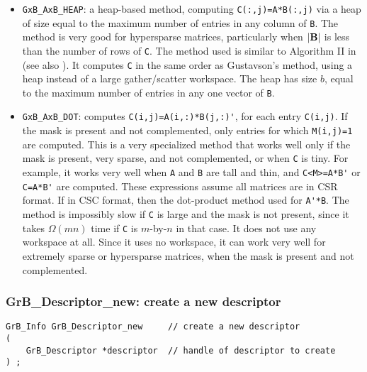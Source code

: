 \documentclass[12pt]{article}
\begin{document}
\begin{itemize}
\begin{itemize}
    \item \verb'GxB_AxB_HEAP': a heap-based method, computing
    \verb'C(:,j)=A*B(:,j)' via a heap of size equal to the maximum number of
    entries in any column of \verb'B'.  The method is very good for hypersparse
    matrices, particularly when $|{\bf B}|$ is less than the number of rows of
    \verb'C'.  The method used is similar to Algorithm II in
    \cite{BulucGilbert08} (see also \cite{BulucGilbert12}).  It computes
    \verb'C' in the same order as Gustavson's method, using a heap instead of a
    large gather/scatter workspace.  The heap has size $b$, equal to the
    maximum number of entries in any one vector of \verb'B'.

    \item \verb'GxB_AxB_DOT': computes \verb"C(i,j)=A(i,:)*B(j,:)'", for each
    entry \verb'C(i,j)'.  If the mask is present and not complemented, only
    entries for which \verb'M(i,j)=1' are computed.  This is a very specialized
    method that works well only if the mask is present, very sparse, and not
    complemented, or when \verb'C' is tiny.  For example, it works very well
    when \verb'A' and \verb'B' are tall and thin, and \verb"C<M>=A*B'" or
    \verb"C=A*B'" are computed.  These expressions assume all matrices are in
    CSR format.  If in CSC format, then the dot-product method used for
    \verb"A'*B".  The method is impossibly slow if \verb'C' is large and the
    mask is not present, since it takes $\Omega(mn)$ time if \verb'C' is
    $m$-by-$n$ in that case.  It does not use any workspace at all.  Since it
    uses no workspace, it can work very well for extremely sparse or
    hypersparse matrices, when the mask is present and not complemented.

    \end{itemize}

\end{itemize}

\subsubsection{{\sf GrB\_Descriptor\_new:}  create a new descriptor}
\label{descriptor_new}

\begin{mdframed}[userdefinedwidth=6in]
{\footnotesize
\begin{verbatim}
GrB_Info GrB_Descriptor_new     // create a new descriptor
(
    GrB_Descriptor *descriptor  // handle of descriptor to create
) ;
\end{verbatim} } \end{mdframed}
\end{document}

